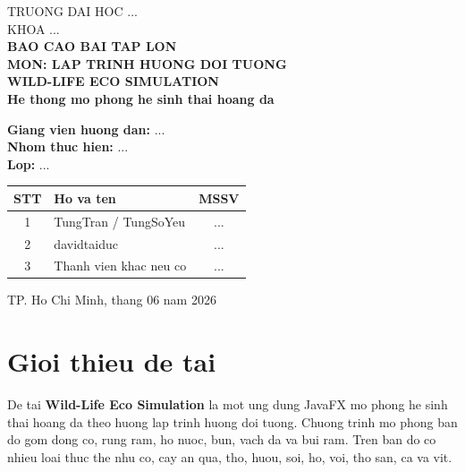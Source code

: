 \documentclass[12pt,a4paper]{article}
\begin{document}
\begin{titlepage}
    \centering

    {\Large TRUONG DAI HOC ...}\\
    {\Large KHOA ...}\\[2cm]

    {\LARGE \textbf{BAO CAO BAI TAP LON}}\\[0.5cm]
    {\Large \textbf{MON: LAP TRINH HUONG DOI TUONG}}\\[1.5cm]

    {\Huge \textbf{WILD-LIFE ECO SIMULATION}}\\[0.5cm]
    {\Large \textbf{He thong mo phong he sinh thai hoang da}}\\[2cm]

    \begin{flushleft}
        \textbf{Giang vien huong dan:} ...\\
        \textbf{Nhom thuc hien:} ...\\
        \textbf{Lop:} ...\\
    \end{flushleft}

    \vspace{1cm}

    \begin{tabular}{|c|l|c|}
        \hline
        \textbf{STT} & \textbf{Ho va ten} & \textbf{MSSV} \\
        \hline
        1 & TungTran / TungSoYeu & ... \\
        \hline
        2 & davidtaiduc & ... \\
        \hline
        3 & Thanh vien khac neu co & ... \\
        \hline
    \end{tabular}

    \vfill

    {\large TP. Ho Chi Minh, thang 06 nam 2026}
\end{titlepage}

\tableofcontents
\newpage


\section{Gioi thieu de tai}

De tai \textbf{Wild-Life Eco Simulation} la mot ung dung JavaFX mo phong he sinh thai hoang da theo huong lap trinh huong doi tuong. Chuong trinh mo phong ban do gom dong co, rung ram, ho nuoc, bun, vach da va bui ram. Tren ban do co nhieu loai thuc the nhu co, cay an qua, tho, huou, soi, ho, voi, tho san, ca va vit.
\end{document}
